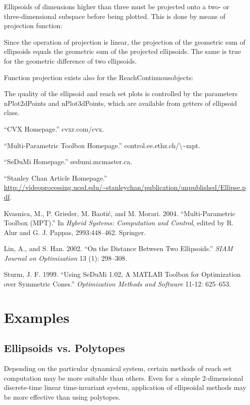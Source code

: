 \documentclass[letterpaper,10pt,english]{sphinxmanual}
\begin{document}
Ellipsoids of dimensions higher than three must be projected onto a two-
or three-dimensional subspace before being plotted. This is done by
means of projection function:

Since the operation of projection is linear, the projection of the
geometric sum of ellipsoids equals the geometric sum of the projected
ellipsoids. The same is true for the geometric difference of two
ellipsoids.

Function projection exists also for the
ReachContinuous\backslashReachDiscrete objects:

The quality of the ellipsoid and reach set plots is controlled by the
parameters nPlot2dPoints and nPlot3dPoints, which are available from
getters of ellipsoid class.

“CVX Homepage.” cvxr.com/cvx.

“Multi-Parametric Toolbox Homepage.” control.ee.ethz.ch/\textbackslash{}\textasciitilde{}mpt.

“SeDuMi Homepage.” sedumi.mcmaster.ca.

“Stanley Chan Article Homepage.”
\href{http://videoprocessing.ucsd.edu/~stanleychan/publication/unpublished/Ellipse.pdf}{http://videoprocessing.ucsd.edu/\textasciitilde{}stanleychan/publication/unpublished/Ellipse.pdf}.

Kvasnica, M., P. Grieder, M. Baotić, and M. Morari. 2004.
“Multi-Parametric Toolbox (MPT).” In \emph{Hybrid Systems: Computation and
Control}, edited by R. Alur and G. J. Pappas, 2993:448–462. Springer.

Lin, A., and S. Han. 2002. “On the Distance Between Two Ellipsoids.”
\emph{SIAM Journal on Optimization} 13 (1): 298–308.

Sturm, J. F. 1999. “Using SeDuMi 1.02, A MATLAB Toolbox for Optimization
over Symmetric Cones.” \emph{Optimization Methods and Software} 11-12:
625–653.


\chapter{Examples}
\label{chap_examples::doc}\label{chap_examples:examples}

\section{Ellipsoids vs. Polytopes}
\label{chap_examples:ellipsoids-vs-polytopes}
Depending on the particular dynamical system, certain methods of reach
set computation may be more suitable than others. Even for a simple
2-dimensional discrete-time linear time-invariant system, application of
ellipsoidal methods may be more effective than using polytopes.
\end{document}
